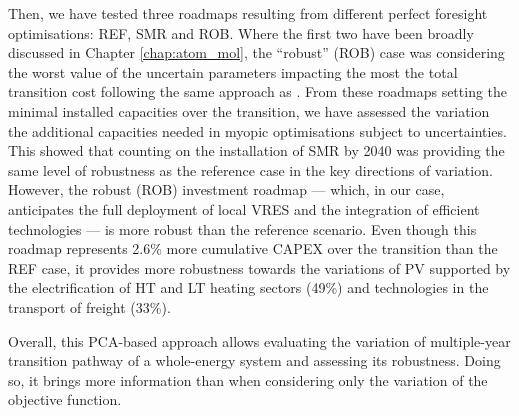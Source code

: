 Then, we have tested three roadmaps resulting from different perfect foresight optimisations: REF, SMR and ROB. Where the first two have been broadly discussed in Chapter \ref{chap:atom_mol}, the ``robust'' (ROB) case was considering the worst value of the uncertain parameters impacting the most the total transition cost following the same approach as \citet{Moret2017PhDThesis}. From these roadmaps setting the minimal installed capacities over the transition, we have assessed the variation the additional capacities needed in myopic optimisations subject to uncertainties. This showed that counting on the installation of \gls{SMR} by 2040 was providing the same level of robustness as the reference case in the key directions of variation. However, the robust (ROB) investment roadmap --- which, in our case, anticipates the full deployment of local \gls{VRES} and the integration of efficient technologies --- is more robust than the reference scenario. Even though this roadmap represents 2.6\% more cumulative \gls{CAPEX} over the transition than the REF case, it provides more robustness towards the variations of \gls{PV} supported by the electrification of \gls{HT} and \gls{LT} heating sectors (49\%) and technologies in the transport of freight (33\%). 

Overall, this \gls{PCA}-based approach allows evaluating the variation of multiple-year transition pathway of a whole-energy system and assessing its robustness. Doing so, it brings more information than when considering only the variation of the objective function.


